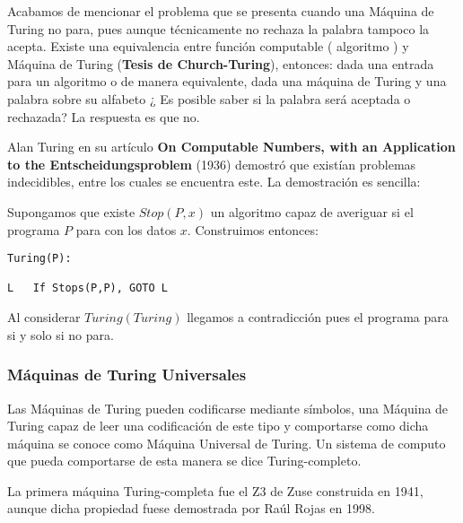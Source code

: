 Acabamos de mencionar el problema que se presenta cuando una Máquina de Turing no para, pues aunque técnicamente no rechaza la palabra tampoco la acepta. Existe una equivalencia entre función computable ( algoritmo ) y Máquina de Turing (\textbf{Tesis de Church-Turing}), entonces: dada una entrada para un algoritmo o de manera equivalente, dada una máquina de Turing y una palabra sobre su alfabeto ¿ Es posible saber si la palabra será aceptada o rechazada? La respuesta es que no.

\vspace{10px}

Alan Turing en su artículo \textbf{On Computable Numbers, with an Application to the Entscheidungsproblem} (1936) demostró que existían problemas indecidibles, entre los cuales se encuentra este. La demostración es sencilla:

\vspace{10px}

Supongamos que existe $Stop(P,x)$ un algoritmo capaz de averiguar si el programa $P$ para con los datos $x$. Construimos entonces:

\begin{lstlisting}
Turing(P):

L	If Stops(P,P), GOTO L
\end{lstlisting}

\vspace{0.5cm}

Al considerar $Turing(Turing)$ llegamos a contradicción pues el programa para si y solo si no para.

\subsubsection{Máquinas de Turing Universales}

Las Máquinas de Turing pueden codificarse mediante símbolos, una Máquina de Turing capaz de leer una codificación de este tipo y comportarse como dicha máquina se conoce como Máquina Universal de Turing. Un sistema de computo que pueda comportarse de esta manera se dice Turing-completo.

\vspace{10px}

La primera máquina Turing-completa fue el Z3 de Zuse construida en 1941, aunque dicha propiedad fuese demostrada por Raúl Rojas en 1998.

\vspace{10px}


